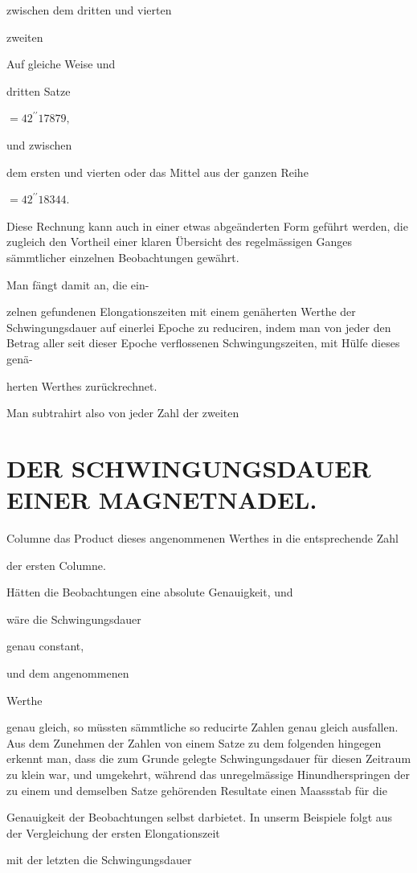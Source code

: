 \documentclass[12pt,a4paper]{article}
\begin{document}
zwischen dem dritten und vierten

zweiten

Auf gleiche Weise und

dritten Satze

$= 42^{\prime\prime}17879,$

und zwischen

dem ersten und vierten oder das Mittel aus der ganzen Reihe

$= 42^{\prime\prime} 18344.$

Diese Rechnung kann auch in einer etwas abgeänderten Form geführt werden, die zugleich den Vortheil einer klaren Übersicht des regelmässigen Ganges sämmtlicher einzelnen Beobachtungen gewährt.

Man fängt damit an, die ein-

zelnen gefundenen Elongationszeiten mit einem genäherten Werthe der Schwingungsdauer auf einerlei Epoche zu reduciren, indem man von jeder den Betrag aller seit dieser Epoche verflossenen Schwingungszeiten, mit Hülfe dieses genä-

herten Werthes zurückrechnet.

Man subtrahirt also von jeder Zahl der zweiten

\section*{DER SCHWINGUNGSDAUER EINER MAGNETNADEL.}
Columne das Product dieses angenommenen Werthes in die entsprechende Zahl

der ersten Columne.

Hätten die Beobachtungen eine absolute Genauigkeit, und

wäre die Schwingungsdauer

genau constant,

und dem angenommenen

Werthe

genau gleich, so müssten sämmtliche so reducirte Zahlen genau gleich ausfallen. Aus dem Zunehmen der Zahlen von einem Satze zu dem folgenden hingegen erkennt man, dass die zum Grunde gelegte Schwingungsdauer für diesen Zeitraum zu klein war, und umgekehrt, während das unregelmässige Hinundherspringen der zu einem und demselben Satze gehörenden Resultate einen Maassstab für die

Genauigkeit der Beobachtungen selbst darbietet. In unserm Beispiele folgt aus der Vergleichung der ersten Elongationszeit

mit der letzten die Schwingungsdauer
\end{document}
